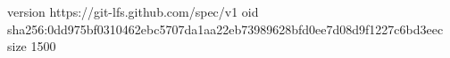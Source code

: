 version https://git-lfs.github.com/spec/v1
oid sha256:0dd975bf0310462ebc5707da1aa22eb73989628bfd0ee7d08d9f1227c6bd3eec
size 1500
